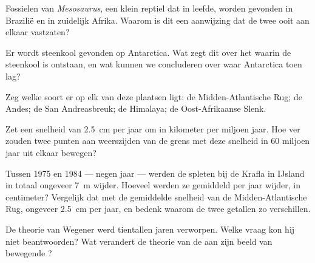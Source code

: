 \begin{exercise}[$\star$]\label{exo:g7:plate-tectonics:4}
Fossielen van \emph{Mesosaurus}, een klein reptiel dat in 
leefde, worden gevonden in Brazilië en in zuidelijk Afrika. Waarom is dit
een aanwijzing dat de twee  ooit aan elkaar vastzaten?
\end{exercise}

\begin{exercise}[$\star\star$]\label{exo:g7:plate-tectonics:5}
Er wordt steenkool gevonden op Antarctica. Wat zegt dit over het 
waarin de steenkool is ontstaan, en wat kunnen we concluderen over waar
Antarctica toen lag?
\end{exercise}

\begin{exercise}[$\star\star$]\label{exo:g7:plate-tectonics:6}
Zeg welke soort  er op elk van deze plaatsen ligt: de
Midden-Atlantische Rug; de Andes; de San Andreasbreuk; de Himalaya; de
Oost-Afrikaanse Slenk.
\end{exercise}

\begin{exercise}[$\star\star$]\label{exo:g7:plate-tectonics:7}
Zet een snelheid van \qty{2.5}{cm} per jaar om in kilometer per miljoen
jaar. Hoe ver zouden twee punten aan weerszijden van de grens met deze
snelheid in 60 miljoen jaar uit elkaar bewegen?
\end{exercise}

\begin{exercise}[$\star\star$]\label{exo:g7:plate-tectonics:8}
Tussen 1975 en 1984 --- negen jaar --- werden de spleten bij de 
Krafla in IJsland in totaal ongeveer \qty{7}{m} wijder. Hoeveel werden ze
gemiddeld per jaar wijder, in centimeter? Vergelijk dat met de gemiddelde
snelheid van de Midden-Atlantische Rug, ongeveer \qty{2.5}{cm} per jaar,
en bedenk waarom de twee getallen zo verschillen.
\end{exercise}

\begin{exercise}[$\star\star$]\label{exo:g7:plate-tectonics:9}
De theorie van Wegener werd tientallen jaren verworpen. Welke vraag kon hij
niet beantwoorden? Wat verandert de theorie van de  aan zijn
beeld van bewegende ?
\end{exercise}

